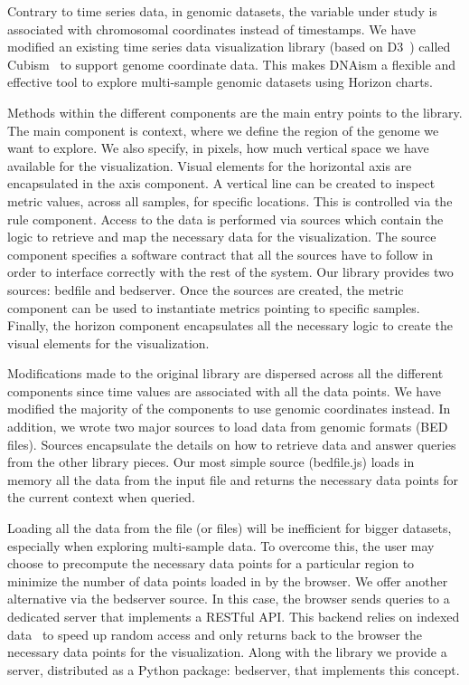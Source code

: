 \documentclass{bioinfo}
\begin{document}
Contrary to time series data, in genomic datasets, the variable under study is
associated with chromosomal coordinates instead of timestamps. We have modified
an existing time series data visualization library (based on D3~\citep{2011-d3})
called Cubism~\citep{cubism} to support genome coordinate data. This makes DNAism
a flexible and effective tool to explore multi-sample genomic datasets using
Horizon charts.


Methods within the different components are the main entry points to the
library. The main component is context, where we define the region of the
genome we want to explore. We also specify, in pixels, how much vertical space
we have available for the visualization. Visual elements for the horizontal
axis are encapsulated in the axis component. A vertical line can be created to
inspect metric values, across all samples, for specific locations. This is
controlled via the rule component. Access to the data is performed via sources
which contain the logic to retrieve and map the necessary data for the
visualization. The source component specifies a software contract that all the
sources have to follow in order to interface correctly with the rest of the
system. Our library provides two sources: bedfile and bedserver. Once the
sources are created, the metric component can be used to instantiate metrics
pointing to specific samples. Finally, the horizon component encapsulates all
the necessary logic to create the visual elements for the visualization.

Modifications made to the original library are dispersed across all the
different components since time values are associated with all the data points.
We have modified the majority of the components to use genomic coordinates
instead. In addition, we wrote two major sources  to load data from genomic
formats (BED files). Sources encapsulate the details on how to retrieve data
and answer queries from the other library pieces. Our most simple source
(bedfile.js) loads in memory all the data from the input file and returns the
necessary data points for the current context when queried.

Loading all the data from the file (or files) will be inefficient for bigger
datasets, especially when exploring multi-sample data. To overcome this, the
user may choose to precompute the necessary data points for a particular region
to minimize the number of data points loaded in by the browser. We offer
another alternative via the bedserver source. In this case, the browser sends
queries to a dedicated server that implements a RESTful API. This backend
relies on indexed data~\citep{tabix-li} to speed up random access and only
returns back to the browser the necessary data points for the visualization.
Along with the library we provide a server, distributed as a Python package:
bedserver, that implements this concept.
\end{document}
